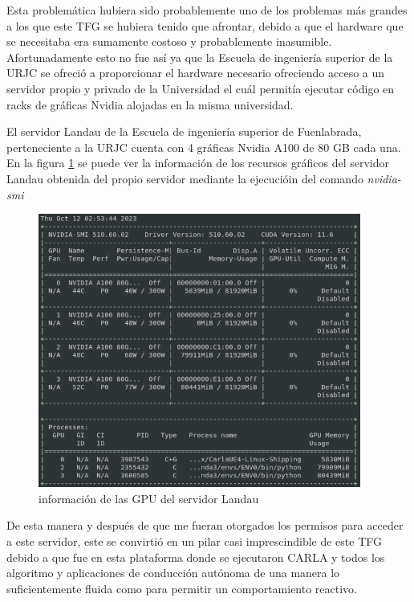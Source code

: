\bigskip

Esta problemática hubiera sido probablemente uno de los problemas más grandes a los que este \ac{TFG} se hubiera tenido que afrontar, debido a que el hardware que se necesitaba era sumamente costoso y probablemente inasumible. Afortunadamente esto no fue así ya que la Escuela de ingeniería superior de la \ac{URJC} se ofreció a proporcionar el hardware necesario ofreciendo acceso a un servidor propio y privado de la Universidad el cuál permitía ejecutar código en racks de gráficas Nvidia alojadas en la misma universidad.

\bigskip

El servidor Landau de la Escuela de ingeniería superior de Fuenlabrada, perteneciente a la \ac{URJC} cuenta con 4 gráficas Nvidia A100 de 80 GB cada una. En la figura \ref{fig:graficas servidor landau} se puede ver la información de los recursos gráficos del servidor Landau obtenida del propio servidor mediante la ejecucióin del comando \textit{nvidia-smi}
\bigskip

\begin{figure} [H]
	\begin{center}
	\includegraphics[height=9cm]{imagenes/cap3/graficas.png}
	\end{center}
	\caption[carla to ros bridge]{información de las GPU del servidor Landau}
	\label{fig:graficas servidor landau}
\end{figure}


\bigskip

De esta manera y después de que me fueran otorgados los permisos para acceder a este servidor, este se convirtió en un pilar casi imprescindible de este \ac{TFG} debido a que fue en esta plataforma donde se ejecutaron CARLA y todos los algoritmo y aplicaciones de conducción autónoma de una manera lo suficientemente fluida como para permitir un comportamiento reactivo.

\newpage
	









